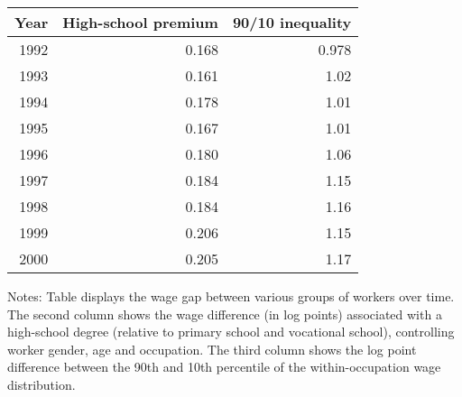 \begin{tabular}{rrr}
\hline \hline
 Year &  High-school premium &  90/10 inequality \\
\hline

1992 & 0.168 & 0.978\\
1993 & 0.161 & 1.02\\
1994 & 0.178 & 1.01\\
1995 & 0.167 & 1.01\\
1996 & 0.180 & 1.06\\
1997 & 0.184 & 1.15\\
1998 & 0.184 & 1.16\\
1999 & 0.206 & 1.15\\
2000 & 0.205 & 1.17\\
\hline \hline
\end{tabular}
\begin{tablenotes}
\item \footnotesize Notes: Table displays the wage gap between various groups of workers over time. The second column shows the wage difference (in log points) associated with a high-school degree (relative to primary school and vocational school), controlling worker gender, age and occupation. The third column shows the log point difference between the 90th and 10th percentile of the within-occupation wage distribution. 
\end{tablenotes} 